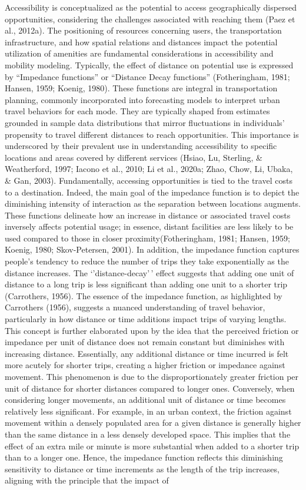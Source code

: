 \documentclass[
11pt, %
oneside, %
english, %
singlespacing, %
]{macthesis} %
\begin{document}
Accessibility is conceptualized as the potential to access geographically dispersed opportunities, considering the challenges associated with reaching them (Paez et al., 2012a). The positioning of resources concerning users, the transportation infrastructure, and how spatial relations and distances impact the potential utilization of amenities are fundamental considerations in accessibility and mobility modeling. Typically, the effect of distance on potential use is expressed by ``Impedance functions'' or ``Distance Decay functions'' (Fotheringham, 1981; Hansen, 1959; Koenig, 1980). These functions are integral in transportation planning, commonly incorporated into forecasting models to interpret urban travel behaviors for each mode. They are typically shaped from estimates grounded in sample data distributions that mirror fluctuations in individuals' propensity to travel different distances to reach opportunities. This importance is underscored by their prevalent use in understanding accessibility to specific locations and areas covered by different services (Hsiao, Lu, Sterling, \& Weatherford, 1997; Iacono et al., 2010; Li et al., 2020a; Zhao, Chow, Li, Ubaka, \& Gan, 2003). Fundamentally, accessing opportunities is tied to the travel costs to a destination. Indeed, the main goal of the impedance function is to depict the diminishing intensity of interaction as the separation between locations augments. These functions delineate how an increase in distance or associated travel costs inversely affects potential usage; in essence, distant facilities are less likely to be used compared to those in closer proximity(Fotheringham, 1981; Hansen, 1959; Koenig, 1980; Skov-Petersen, 2001). In addition, the impedance function captures people's tendency to reduce the number of trips they take exponentially as the distance increases. The `'distance-decay'\,' effect suggests that adding one unit of distance to a long trip is less significant than adding one unit to a shorter trip (Carrothers, 1956). The essence of the impedance function, as highlighted by Carrothers (1956), suggests a nuanced understanding of travel behavior, particularly in how distance or time additions impact trips of varying lengths. This concept is further elaborated upon by the idea that the perceived friction or impedance per unit of distance does not remain constant but diminishes with increasing distance. Essentially, any additional distance or time incurred is felt more acutely for shorter trips, creating a higher friction or impedance against movement. This phenomenon is due to the disproportionately greater friction per unit of distance for shorter distances compared to longer ones. Conversely, when considering longer movements, an additional unit of distance or time becomes relatively less significant. For example, in an urban context, the friction against movement within a densely populated area for a given distance is generally higher than the same distance in a less densely developed space. This implies that the effect of an extra mile or minute is more substantial when added to a shorter trip than to a longer one. Hence, the impedance function reflects this diminishing sensitivity to distance or time increments as the length of the trip increases, aligning with the principle that the impact of 
\end{document}
